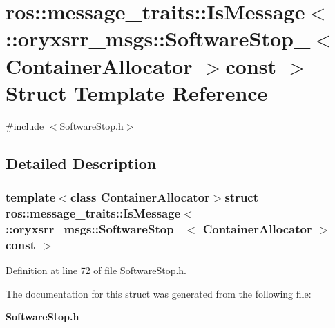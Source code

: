 \section{ros\-:\-:message\-\_\-traits\-:\-:\-Is\-Message$<$ \-:\-:oryxsrr\-\_\-msgs\-:\-:\-Software\-Stop\-\_\-$<$ \-Container\-Allocator $>$const $>$ \-Struct \-Template \-Reference}
\label{structros_1_1message__traits_1_1IsMessage_3_01_1_1oryxsrr__msgs_1_1SoftwareStop___3_01ContainerAllocator_01_4const_01_01_4}


{\ttfamily \#include $<$\-Software\-Stop.\-h$>$}



\subsection{\-Detailed \-Description}
\subsubsection*{template$<$class Container\-Allocator$>$struct ros\-::message\-\_\-traits\-::\-Is\-Message$<$ \-::oryxsrr\-\_\-msgs\-::\-Software\-Stop\-\_\-$<$ Container\-Allocator $>$const  $>$}



\-Definition at line 72 of file \-Software\-Stop.\-h.



\-The documentation for this struct was generated from the following file\-:\begin{DoxyCompactItemize}
\item 
{\bf \-Software\-Stop.\-h}\end{DoxyCompactItemize}
